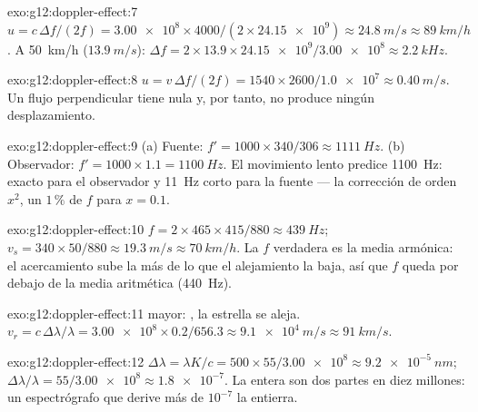 \begin{solution}{exo:g12:doppler-effect:7}
$u = c\,\Delta f/(2f) = \num{3.00e8} \times 4000/(2 \times
\num{24.15e9}) \approx \qty{24.8}{m/s} \approx \qty{89}{km/h}$. A
\qty{50}{km/h} ($\qty{13.9}{m/s}$):
$\Delta f = 2 \times 13.9 \times \num{24.15e9}/\num{3.00e8} \approx
\qty{2.2}{kHz}$.
\end{solution}

\begin{solution}{exo:g12:doppler-effect:8}
$u = v\,\Delta f/(2f) = 1540 \times 2600/\num{1.0e7} \approx
\qty{0.40}{m/s}$. Un flujo perpendicular tiene  nula y,
por tanto, no produce ningún desplazamiento.
\end{solution}

\begin{solution}{exo:g12:doppler-effect:9}
(a) Fuente: $f' = 1000 \times 340/306 \approx \qty{1111}{Hz}$. (b)
Observador: $f' = 1000 \times 1.1 = \qty{1100}{Hz}$. El movimiento lento
predice \qty{1100}{Hz}: exacto para el observador y \qty{11}{Hz} corto
para la fuente --- la corrección de orden $x^2$, un $1\,\%$ de $f$ para
$x = 0.1$.
\end{solution}

\begin{solution}{exo:g12:doppler-effect:10}
$f = 2 \times 465 \times 415/880 \approx \qty{439}{Hz}$;
$v_s = 340 \times 50/880 \approx \qty{19.3}{m/s} \approx
\qty{70}{km/h}$. La $f$ verdadera es la media armónica: el acercamiento
sube la  más de lo que el alejamiento la baja, así que $f$
queda por debajo de la media aritmética (\qty{440}{Hz}).
\end{solution}

\begin{solution}{exo:g12:doppler-effect:11}
 mayor: , la estrella se aleja.
$v_r = c\,\Delta\lambda/\lambda = \num{3.00e8} \times 0.2/656.3 \approx
\qty{9.1e4}{m/s} \approx \qty{91}{km/s}$.
\end{solution}

\begin{solution}{exo:g12:doppler-effect:12}
$\Delta\lambda = \lambda K/c = 500 \times 55/\num{3.00e8} \approx
\qty{9.2e-5}{nm}$;
$\Delta\lambda/\lambda = 55/\num{3.00e8} \approx \num{1.8e-7}$. La 
entera son dos partes en diez millones: un espectrógrafo que derive más
de $10^{-7}$ la entierra.
\end{solution}

